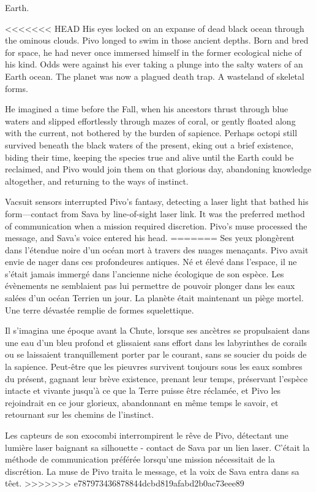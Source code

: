 Earth. 

<<<<<<< HEAD
His eyes locked on an expanse of dead black ocean through the ominous clouds. Pivo longed to swim in those ancient depths. Born and bred for space, he had never once immersed himself in the former ecological niche of his kind. Odds were against his ever taking a plunge into the salty waters of an Earth ocean. The planet was now a plagued death trap. A wasteland of skeletal forms. 

He imagined a time before the Fall, when his ancestors thrust through blue waters and slipped effortlessly through mazes of coral, or gently floated along with the current, not bothered by the burden of sapience. Perhaps octopi still survived beneath the black waters of the present, eking out a brief existence, biding their time, keeping the species true and alive until the Earth could be reclaimed, and Pivo would join them on that glorious day, abandoning knowledge altogether, and returning to the ways of instinct. 

Vacsuit sensors interrupted Pivo's fantasy, detecting a laser light that bathed his form—contact from Sava by line-of-sight laser link. It was the preferred method of communication when a mission required discretion. Pivo's muse processed the message, and Sava's voice entered his head. 
=======
Ses yeux plongèrent dans l'étendue noire d'un océan mort à travers des nuages menaçants. Pivo avait envie de nager dans ces profondeures antiques. Né et élevé dans l'espace, il ne s'était jamais immergé dans l'ancienne niche écologique de son espèce. Les évènements ne semblaient pas lui permettre de pouvoir plonger dans les eaux salées d'un océan Terrien un jour. La planète était maintenant un piège mortel. Une terre dévastée remplie de formes squelettique. 

Il s'imagina une époque avant la Chute, lorsque ses ancètres se propulsaient dans une eau d'un bleu profond et glissaient sans effort dans les labyrinthes de corails ou se laissaient tranquillement porter par le courant, sans se soucier du poids de la sapience. Peut-être que les pieuvres survivent toujours sous les eaux sombres du présent, gagnant leur brève existence, prenant leur temps, préservant l'espèce intacte et vivante jusqu'à ce que la Terre puisse être réclamée, et Pivo les rejoindrait en ce jour glorieux, abandonnant en même temps le savoir, et retournant sur les chemins de l'instinct. 

Les capteurs de son exocombi interrompirent le rêve de Pivo, détectant une lumière laser baignant sa silhouette - contact de Sava par un lien laser. C'était la méthode de communication préférée lorsqu'une mission nécessitait de la discrétion. La muse de Pivo traita le message, et la voix de Sava entra dans sa têet. 
>>>>>>> e787973436878844dcbd819afabd2b0ac73eee89

